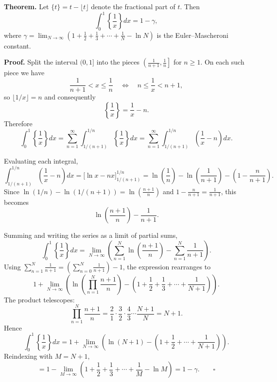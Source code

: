 \textbf{Theorem.} Let $\{t\} = t - \lfloor t \rfloor$ denote the fractional part of $t$. Then
\[
\int_{0}^{1} \left\{ \frac{1}{x} \right\} dx = 1 - \gamma,
\]
where $\gamma = \lim_{N \to \infty}\left(1 + \tfrac{1}{2} + \tfrac{1}{3} + \cdots + \tfrac{1}{N} - \ln N\right)$ is the Euler--Mascheroni constant.

\textbf{Proof.}
Split the interval $(0,1]$ into the pieces $\left(\tfrac{1}{n+1}, \tfrac{1}{n}\right]$ for $n \geq 1$. On each such piece we have
\[
\frac{1}{n+1} < x \leq \frac{1}{n} \quad\Longleftrightarrow\quad n \leq \frac{1}{x} < n+1,
\]
so $\lfloor 1/x \rfloor = n$ and consequently
\[
\left\{ \frac{1}{x} \right\} = \frac{1}{x} - n.
\]
Therefore
\[
\int_{0}^{1} \left\{ \frac{1}{x} \right\} dx
= \sum_{n=1}^{\infty} \int_{1/(n+1)}^{1/n} \left\{ \frac{1}{x} \right\} dx
= \sum_{n=1}^{\infty} \int_{1/(n+1)}^{1/n} \left( \frac{1}{x} - n \right) dx.
\]

Evaluating each integral,
\[
\int_{1/(n+1)}^{1/n} \left( \frac{1}{x} - n \right) dx
= \Big[\ln x - n x\Big]_{1/(n+1)}^{1/n}
= \ln\!\left(\frac{1}{n}\right) - \ln\!\left(\frac{1}{n+1}\right) - \left(1 - \frac{n}{n+1}\right).
\]
Since $\ln(1/n) - \ln(1/(n+1)) = \ln\!\left(\frac{n+1}{n}\right)$ and $1 - \frac{n}{n+1} = \frac{1}{n+1}$, this becomes
\[
\ln\!\left(\frac{n+1}{n}\right) - \frac{1}{n+1}.
\]

Summing and writing the series as a limit of partial sums,
\[
\int_{0}^{1} \left\{ \frac{1}{x} \right\} dx
= \lim_{N \to \infty} \left( \sum_{n=1}^{N} \ln\!\left(\frac{n+1}{n}\right) - \sum_{n=1}^{N} \frac{1}{n+1} \right).
\]
Using $\sum_{n=1}^{N} \frac{1}{n+1} = \left(\sum_{n=0}^{N}\frac{1}{n+1}\right) - 1$, the expression rearranges to
\[
1 + \lim_{N \to \infty} \left( \ln\!\left( \prod_{n=1}^{N} \frac{n+1}{n} \right) - \left(1 + \frac{1}{2} + \frac{1}{3} + \cdots + \frac{1}{N+1}\right) \right).
\]
The product telescopes:
\[
\prod_{n=1}^{N} \frac{n+1}{n}
= \frac{2}{1} \cdot \frac{3}{2} \cdot \frac{4}{3} \cdots \frac{N+1}{N}
= N + 1.
\]
Hence
\[
\int_{0}^{1} \left\{ \frac{1}{x} \right\} dx
= 1 + \lim_{N \to \infty} \left( \ln(N+1) - \left(1 + \frac{1}{2} + \cdots + \frac{1}{N+1}\right) \right).
\]
Reindexing with $M = N + 1$,
\[
= 1 - \lim_{M \to \infty} \left( 1 + \frac{1}{2} + \frac{1}{3} + \cdots + \frac{1}{M} - \ln M \right)
= 1 - \gamma. \qquad\square
\]
